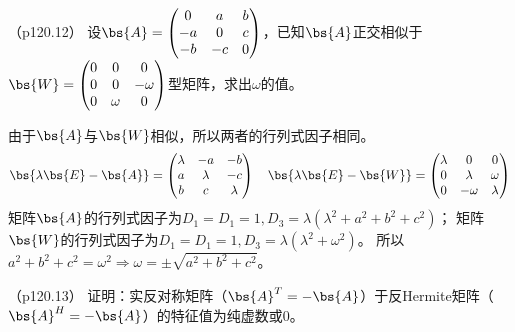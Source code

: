 \documentclass[12pt, a4paper, oneside, UTF8]{ctexbook}
\begin{document}
\begin{question}（p120.12）
    设$\bs{A}=\begin{pmatrix}
        0 & a& b \\
        -a & 0 &c \\
        -b & -c & 0
    \end{pmatrix}$，已知$\bs{A}$正交相似于$\bs{W}=\begin{pmatrix}
        0 & 0& 0 \\
        0 & 0 &-\omega \\
        0 & \omega & 0
    \end{pmatrix}$型矩阵，求出$\omega$的值。
\end{question}

\begin{solution}
    由于$\bs{A}$与$\bs{W}$相似，所以两者的行列式因子相同。
    \begin{align*}
        \bs{\lambda \bs{E}-\bs{A}}=\begin{pmatrix}
            \lambda & -a& -b \\
            a & \lambda & -c \\
            b & c & \lambda 
        \end{pmatrix} \quad\bs{\lambda \bs{E}-\bs{W}}=\begin{pmatrix}
            \lambda & 0& 0 \\
            0 & \lambda & \omega \\
            0 & -\omega & \lambda 
        \end{pmatrix}
    \end{align*}
    矩阵$\bs{A}$的行列式因子为$D_1=D_1=1,D_3=\lambda(\lambda^2+a^2+b^2+c^2)$；
    矩阵$\bs{W}$的行列式因子为$D_1=D_1=1,D_3=\lambda(\lambda^2+\omega^2)$。
    所以$a^2+b^2+c^2=\omega^2 \Rightarrow \omega=\pm \sqrt{a^2+b^2+c^2}$。
\end{solution}

\begin{question}（p120.13）
    证明：实反对称矩阵（$\bs{A}^T=-\bs{A}$）于反Hermite矩阵（$\bs{A}^H=-\bs{A}$）的特征值为纯虚数或0。
\end{question}
\end{document}

